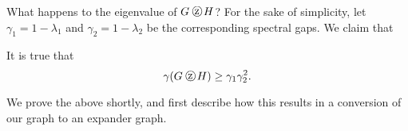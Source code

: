 
			What happens to the eigenvalue of $G\zigzag H$? For the sake of simplicity, let $\gamma_1 = 1-\lambda_1$ and $\gamma_2 = 1-\lambda_2$ be the corresponding spectral gaps. We claim that
			\begin{flem}
				\label{lem: zigzag spectral gap}
				It is true that
				\[ \gamma(G\zigzag H) \ge \gamma_1 \gamma_2^2. \]
			\end{flem}
			We prove the above shortly, and first describe how this results in a conversion of our graph to an expander graph.\\
		
